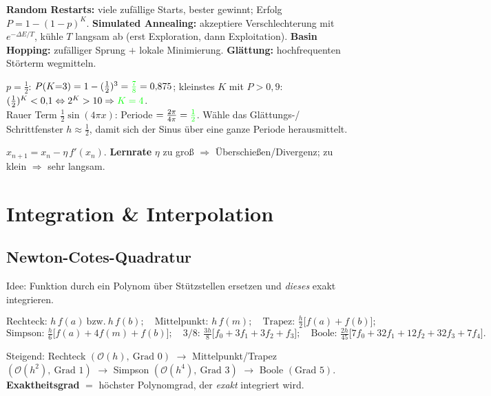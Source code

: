 \documentclass[a4paper,11pt]{article}
\newcommand{\f}[1]{\textcolor{green}{#1}}
\begin{document}
\begin{formel}
\textbf{Random Restarts:} viele zufällige Starts, bester gewinnt; Erfolg
$P=1-(1-p)^K$. \;
\textbf{Simulated Annealing:} akzeptiere Verschlechterung mit $e^{-\Delta E/T}$, kühle $T$ langsam ab
(erst Exploration, dann Exploitation). \;
\textbf{Basin Hopping:} zufälliger Sprung $+$ lokale Minimierung. \;
\textbf{Glättung:} hochfrequenten Störterm wegmitteln.
\end{formel}

\begin{beispiel}
$p=\tfrac12$: $P(K{=}3)=1-(\tfrac12)^3=\f{\tfrac78}=0{,}875$; kleinstes $K$ mit $P>0{,}9$:
$(\tfrac12)^K<0{,}1\Leftrightarrow 2^K>10\Rightarrow \f{K=4}$.\\
Rauer Term $\tfrac12\sin(4\pi x)$: Periode $=\tfrac{2\pi}{4\pi}=\f{\tfrac12}$. Wähle das Glättungs-/
Schrittfenster $h\approx\tfrac12$, damit sich der Sinus über eine ganze Periode herausmittelt.
\end{beispiel}

\begin{formel}[Gradientenabstieg]
$x_{n+1}=x_n-\eta\,f'(x_n)$. \textbf{Lernrate} $\eta$ zu groß $\Rightarrow$ Überschießen/Divergenz;
zu klein $\Rightarrow$ sehr langsam.
\end{formel}

\section{Integration \& Interpolation}

\subsection{Newton-Cotes-Quadratur}
Idee: Funktion durch ein Polynom über Stützstellen ersetzen und \emph{dieses} exakt integrieren.
\begin{formel}[{Regeln auf $[a,b]$, $h=b-a$, $m=\tfrac{a+b}2$; Gewichte für ein Panel}]
\[ \text{Rechteck: } h\,f(a)\ \text{bzw.}\ h\,f(b);\quad
   \text{Mittelpunkt: } h\,f(m);\quad
   \text{Trapez: } \tfrac h2\big[f(a)+f(b)\big]; \]
\[ \text{Simpson: } \tfrac h6\big[f(a)+4f(m)+f(b)\big];\quad
   \text{$3/8$: } \tfrac{3h}{8}\big[f_0+3f_1+3f_2+f_3\big];\quad
   \text{Boole: } \tfrac{2h}{45}\big[7f_0+32f_1+12f_2+32f_3+7f_4\big]. \]
\end{formel}

\begin{formel}
Steigend: Rechteck $(\mathcal O(h),\ \text{Grad }0)$ $\to$ Mittelpunkt/Trapez $(\mathcal O(h^2),\
\text{Grad }1)$ $\to$ Simpson $(\mathcal O(h^4),\ \text{Grad }3)$ $\to$ Boole $(\text{Grad }5)$.
\textbf{Exaktheitsgrad} $=$ höchster Polynomgrad, der \emph{exakt} integriert wird.
\end{formel}
\end{document}
